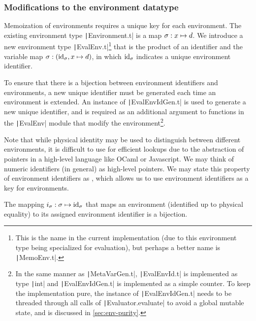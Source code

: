 \subsubsection{Modifications to the environment datatype}
\label{sec:memoization-evalenv}

Memoization of environments requires a unique key for each environment. The existing environment type \texttt|Environment.t| is a map $\sigma:x\mapsto d$. We introduce a new environment type \texttt|EvalEnv.t|\footnote{This is the name in the current implementation (due to this environment type being specialized for evaluation), but perhaps a better name is \texttt|MemoEnv.t|.} that is the product of an identifier and the variable map $\sigma:(\text{id}_\sigma,x\mapsto d)$, in which $\text{id}_\sigma$ indicates a unique environment identifier.

To ensure that there is a bijection between environment identifiers and environments, a new unique identifier must be generated each time an environment is extended. An instance of \texttt|EvalEnvIdGen.t| is used to generate a new unique identifier, and is required as an additional argument to functions in the \texttt|EvalEnv| module that modify the environment\footnote{
  In the same manner as \texttt|MetaVarGen.t|, \texttt|EvalEnvId.t| is implemented as type \texttt|int| and \texttt|EvalEnvIdGen.t| is implemented as a simple counter. To keep the implementation pure, the instance of \texttt|EvalEnvIdGen.t| needs to be threaded through all calls of \texttt|Evaluator.evaluate| to avoid a global mutable state, and is discussed in \cref{sec:env-purity}.
}.

Note that while physical identity may be used to distinguish between different environments, it is difficult to use for efficient lookups due to the abstraction of pointers in a high-level language like OCaml or Javascript. We may think of numeric identifiers (in general) as high-level pointers. We may state this property of environment identifiers as , which allows us to use environment identifiers as a key for environments.

\begin{theorem}
  The mapping $i_\sigma:\sigma\mapsto\text{id}_\sigma$ that maps an environment (identified up to physical equality) to its assigned environment identifier is a bijection.
  \label{thm:env-id}
\end{theorem}

